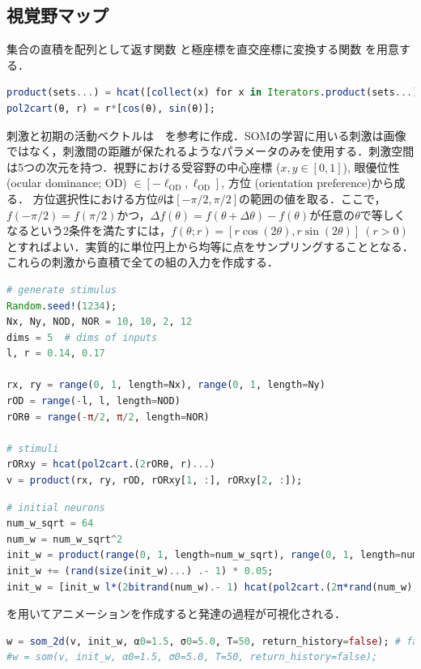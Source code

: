 \subsection{視覚野マップ}
集合の直積を配列として返す関数 と極座標を直交座標に変換する関数 を用意する．
\begin{lstlisting}[language=julia]
product(sets...) = hcat([collect(x) for x in Iterators.product(sets...)]...)' # Array of Cartesian product of sets 
pol2cart(θ, r) = r*[cos(θ), sin(θ)];
\end{lstlisting}
刺激と初期の活動ベクトルは\citep{Carreira-Perpinan2005-gy}　を参考に作成．SOMの学習に用いる刺激は画像ではなく，刺激間の距離が保たれるようなパラメータのみを使用する．刺激空間は5つの次元を持つ．視野における受容野の中心座標 ($x, y \in [0, 1]$), 眼優位性 (ocular dominance; OD) $\in [-\ell_\textrm{OD}, \ell_\textrm{OD}]$, 方位 (orientation preference)から成る． 方位選択性における方位$\theta$は$[-\pi/2, \pi/2]$の範囲の値を取る．ここで，$f(-\pi/2)=f(\pi/2)$かつ，$\Delta f(\theta) = f(\theta+\Delta \theta)-f(\theta)$が任意の$\theta$で等しくなるという2条件を満たすには，$f(\theta; r)=[r\cos(2\theta), r\sin(2\theta)]\ (r>0)$とすればよい．実質的に単位円上から均等に点をサンプリングすることとなる．これらの刺激から直積で全ての組の入力を作成する．
\begin{lstlisting}[language=julia]
# generate stimulus
Random.seed!(1234);
Nx, Ny, NOD, NOR = 10, 10, 2, 12
dims = 5  # dims of inputs 
l, r = 0.14, 0.17

rx, ry = range(0, 1, length=Nx), range(0, 1, length=Ny)
rOD = range(-l, l, length=NOD)
rORθ = range(-π/2, π/2, length=NOR)

# stimuli
rORxy = hcat(pol2cart.(2rORθ, r)...)
v = product(rx, ry, rOD, rORxy[1, :], rORxy[2, :]);
\end{lstlisting}
\begin{lstlisting}[language=julia]
# initial neurons
num_w_sqrt = 64
num_w = num_w_sqrt^2
init_w = product(range(0, 1, length=num_w_sqrt), range(0, 1, length=num_w_sqrt))
init_w += (rand(size(init_w)...) .- 1) * 0.05;
init_w = [init_w l*(2bitrand(num_w).- 1) hcat(pol2cart.(2π*rand(num_w), r)...)'];
\end{lstlisting}
 を用いてアニメーションを作成すると発達の過程が可視化される．
\begin{lstlisting}[language=julia]
w = som_2d(v, init_w, α0=1.5, σ0=5.0, T=50, return_history=false); # faster
#w = som(v, init_w, α0=1.5, σ0=5.0, T=50, return_history=false);
\end{lstlisting}
